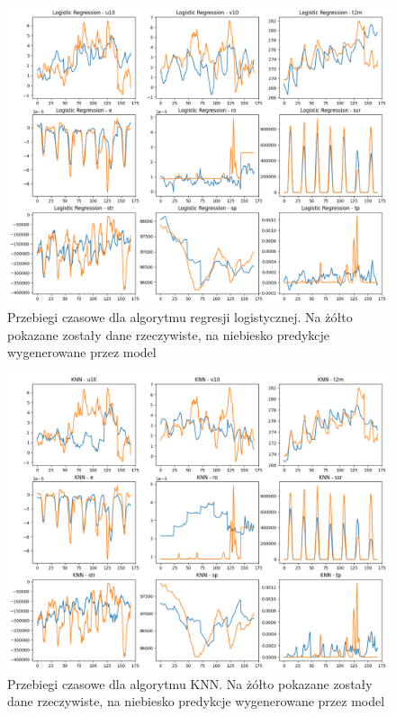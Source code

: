 \begin{figure}[H]
    \centering
    \includegraphics[width=\textwidth]{images/regression_week.png}
    \caption{Przebiegi czasowe dla algorytmu regresji logistycznej. Na żółto pokazane zostały dane 
    rzeczywiste, na niebiesko predykcje wygenerowane przez model}
    \label{regression-week}
\end{figure}

\begin{figure}[H]
    \centering
    \includegraphics[width=\textwidth]{images/knn_week.png}
    \caption{Przebiegi czasowe dla algorytmu KNN. Na żółto pokazane zostały dane 
    rzeczywiste, na niebiesko predykcje wygenerowane przez model}
    \label{knn-week}
\end{figure}

